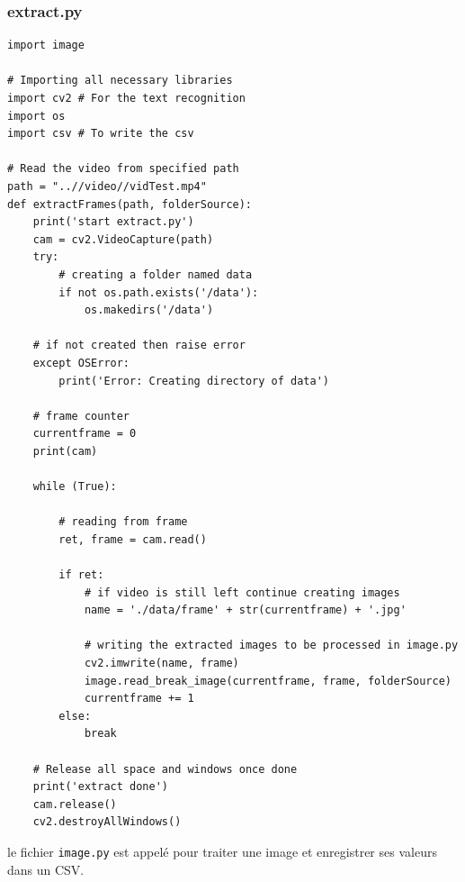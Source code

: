 \documentclass[12pt]{article}
\begin{document}
\subsubsection{extract.py}
\begin{lstlisting}
import image

# Importing all necessary libraries
import cv2 # For the text recognition
import os 
import csv # To write the csv

# Read the video from specified path
path = "..//video//vidTest.mp4"
def extractFrames(path, folderSource):
    print('start extract.py')
    cam = cv2.VideoCapture(path)
    try:
        # creating a folder named data
        if not os.path.exists('/data'):
            os.makedirs('/data')
            
    # if not created then raise error
    except OSError:
        print('Error: Creating directory of data')

    # frame counter
    currentframe = 0
    print(cam)

    while (True):

        # reading from frame
        ret, frame = cam.read()

        if ret:
            # if video is still left continue creating images
            name = './data/frame' + str(currentframe) + '.jpg'

            # writing the extracted images to be processed in image.py
            cv2.imwrite(name, frame)
            image.read_break_image(currentframe, frame, folderSource)
            currentframe += 1
        else:
            break

    # Release all space and windows once done
    print('extract done')
    cam.release()
    cv2.destroyAllWindows()
\end{lstlisting}

le fichier \texttt{image.py} est appelé pour traiter une image et enregistrer ses valeurs dans un CSV.
\end{document}
